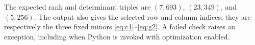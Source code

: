 \documentclass[11pt]{article}
\begin{document}
The expected rank and determinant triples are $(7,693)$, $(23,349)$,
and $(5,256)$. The output also gives the selected row and column indices;
they are respectively the three fixed minors
\eqref{eq:c1}--\eqref{eq:g2}. A failed check raises an exception, including
when Python is invoked with optimization enabled.


\end{document}
